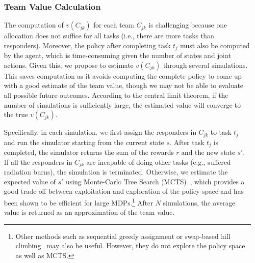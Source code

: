 \subsubsection{Team Value Calculation}
The computation of  $v(C_{jk})$ for each team $C_{jk}$ is
challenging because one allocation does not suffice for all tasks (i.e., there are more tasks than responders).
Moreover, the policy after completing task $t_j$ must also be
computed by the agent, which is time-consuming given the number of
states and joint actions. Given this, we propose to estimate
$v(C_{jk})$ through several simulations. This saves
computation as it avoids computing the complete policy to come
up with a good estimate of the team value, though we may not be
able to evaluate all possible future outcomes. According to the
central limit theorem, if the number of simulations is sufficiently
large, the estimated value will converge to the true $v(C_{jk})$.

Specifically, in each simulation, we first assign the responders in
$C_{jk}$ to task $t_j$ and run the simulator starting from the
current state $s$. After task $t_j$ is completed, the simulator
returns the sum of the rewards $r$ and the new state $s'$. If all
the responders in $C_{jk}$ are incapable of doing other tasks
(e.g., suffered radiation burns), the simulation is terminated.
Otherwise, we estimate the expected value of $s'$ using Monte-Carlo
Tree Search (MCTS)~\cite{kocsis2006bandit}, which provides a good
trade-off between exploitation and exploration of the policy space
and has been shown to be efficient for large MDPs.\footnote{Other
methods such as sequential greedy assignment or swap-based hill
climbing~\cite{proper2009solving} may also be useful. However, they
do not explore the policy space as well as MCTS.} After $N$
simulations, the average value is returned as an approximation of
the team value.

